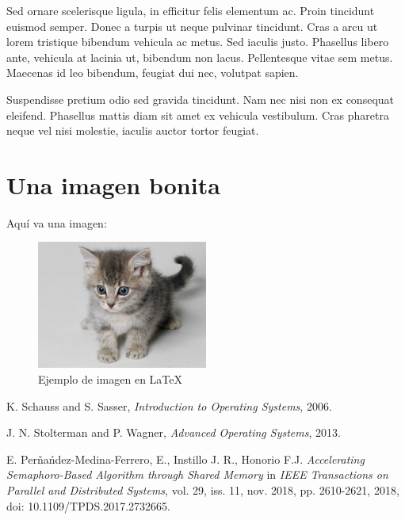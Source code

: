 \documentclass[conference]{IEEEtran}
\begin{document}
Sed ornare scelerisque ligula, in efficitur felis elementum ac. Proin tincidunt euismod semper. Donec a turpis ut neque pulvinar tincidunt. Cras a arcu ut lorem tristique bibendum vehicula ac metus. Sed iaculis justo. Phasellus libero ante, vehicula at lacinia ut, bibendum non lacus. Pellentesque vitae sem metus. Maecenas id leo bibendum, feugiat dui nec, volutpat sapien.

 
Suspendisse pretium odio sed gravida tincidunt. Nam nec nisi non ex consequat eleifend. Phasellus mattis diam sit amet ex vehicula vestibulum. Cras pharetra neque vel nisi molestie, iaculis auctor tortor feugiat.

\section{Una imagen bonita}

Aquí va una imagen:

\begin{figure}[h]
    \centering
    \includegraphics[width=0.5\textwidth]{img/gatito.jpg}
    \caption{Ejemplo de imagen en LaTeX}
    \label{fig:ejemplo}
\end{figure}


\begin{thebibliography}{99}

K. Schauss and S. Sasser, \textit{Introduction to Operating Systems}, 2006.

J. N. Stolterman and P. Wagner, \textit{Advanced Operating Systems}, 2013.

E. Perňańdez-Medina-Ferrero, E., Instillo J. R., Honorio F.J. \textit{Accelerating Semaphoro-Based Algorithm through Shared Memory}
 in \textit{IEEE Transactions on Parallel and Distributed Systems}, vol. 29, iss. 11, nov. 2018, pp. 2610-2621, 2018, doi: 10.1109/TPDS.2017.2732665.


\end{thebibliography}
\end{document}
